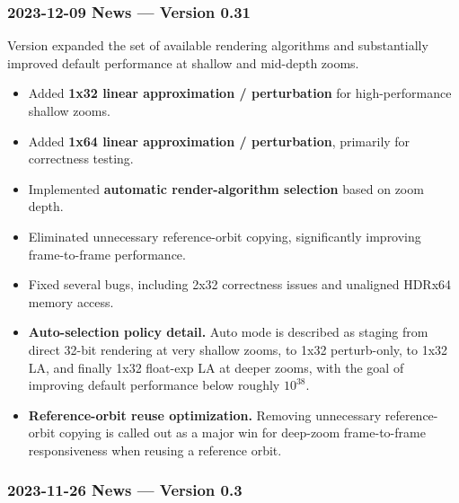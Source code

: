 \subsubsection{2023-12-09 News --- Version 0.31}

Version  expanded the set of available rendering algorithms and
substantially improved default performance at shallow and mid-depth zooms.

\begin{itemize}
  \item Added \textbf{1x32 linear approximation / perturbation} for
  high-performance shallow zooms.
  
  \item Added \textbf{1x64 linear approximation / perturbation}, primarily for
  correctness testing.
  
  \item Implemented \textbf{automatic render-algorithm selection} based on zoom
  depth.
  
  \item Eliminated unnecessary reference-orbit copying, significantly improving
  frame-to-frame performance.
  
  \item Fixed several bugs, including 2x32 correctness issues and unaligned
  HDRx64 memory access.

  \item \textbf{Auto-selection policy detail.} Auto mode is described as staging
  from direct 32-bit rendering at very shallow zooms, to 1x32 perturb-only, to
  1x32 LA, and finally 1x32 float-exp LA at deeper zooms, with the goal of
  improving default performance below roughly $10^{38}$.

  \item \textbf{Reference-orbit reuse optimization.} Removing unnecessary
  reference-orbit copying is called out as a major win for deep-zoom
  frame-to-frame responsiveness when reusing a reference orbit.

\end{itemize}


\subsubsection{2023-11-26 News --- Version 0.3}

